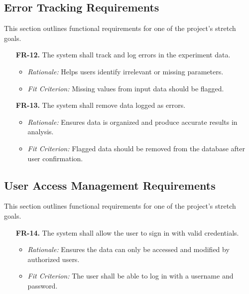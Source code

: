 \documentclass[12pt]{article}
\begin{document}
\subsection{Error Tracking Requirements}
This section outlines functional requirements for one of the project's stretch goals.
\begin{enumerate}
  \item[\textbf{FR-12.}] The system shall track and log errors in the experiment data.
  \begin{itemize}
    \item \textit{Rationale:} Helps users identify irrelevant or missing parameters.
    \item \textit{Fit Criterion:} Missing values from input data should be flagged.
  \end{itemize}
  \item[\textbf{FR-13.}] The system shall remove data logged as errors.
  \begin{itemize}
    \item \textit{Rationale:} Ensures data is organized and produce accurate results in analysis.
    \item \textit{Fit Criterion:} Flagged data should be removed from the database after user confirmation.
  \end{itemize}
\end{enumerate}

\subsection{User Access Management Requirements}
This section outlines functional requirements for one of the project's stretch goals.
\begin{enumerate}
  \item[\textbf{FR-14.}] The system shall allow the user to sign in with valid credentials.
  \begin{itemize}
    \item \textit{Rationale:} Ensures the data can only be accessed and modified by authorized users.
    \item \textit{Fit Criterion:} The user shall be able to log in with a username and password.
  \end{itemize}
\end{enumerate}
\end{document}
